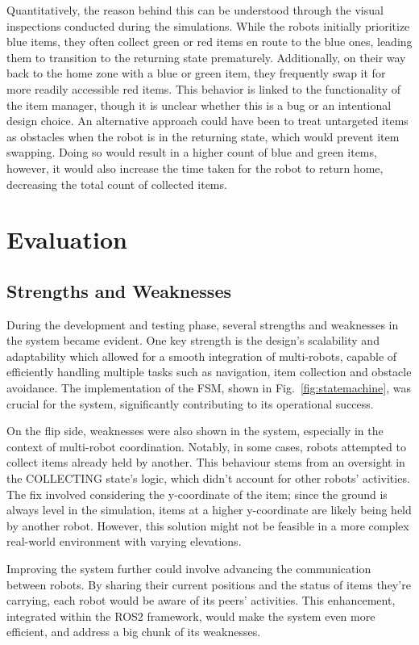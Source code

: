 \documentclass[conference]{IEEEtran}
\begin{document}
Quantitatively, the reason behind this can be understood through the visual inspections conducted during the simulations. While the robots initially prioritize blue items, they often collect green or red items en route to the blue ones, leading them to transition to the returning state prematurely. Additionally, on their way back to the home zone with a blue or green item, they frequently swap it for more readily accessible red items. This behavior is linked to the functionality of the item manager, though it is unclear whether this is a bug or an intentional design choice. An alternative approach could have been to treat untargeted items as obstacles when the robot is in the returning state, which would prevent item swapping. Doing so would result in a higher count of blue and green items, however, it would also increase the time taken for the robot to return home, decreasing the total count of collected items.

\section{Evaluation}
\subsection{Strengths and Weaknesses}

During the development and testing phase, several strengths and weaknesses in the system became evident. One key strength is the design's scalability and adaptability which allowed for a smooth integration of multi-robots, capable of efficiently handling multiple tasks such as navigation, item collection and obstacle avoidance. The implementation of the FSM, shown in Fig.~\ref{fig:statemachine}, was crucial for the system, significantly contributing to its operational success.

On the flip side, weaknesses were also shown in the system, especially in the context of multi-robot coordination. Notably, in some cases, robots attempted to collect items already held by another. This behaviour stems from an oversight in the COLLECTING state's logic, which didn't account for other robots' activities. The fix involved considering the y-coordinate of the item; since the ground is always level in the simulation, items at a higher y-coordinate are likely being held by another robot. However, this solution might not be feasible in a more complex real-world environment with varying elevations.

Improving the system further could involve advancing the communication between robots. By sharing their current positions and the status of items they're carrying, each robot would be aware of its peers' activities. This enhancement, integrated within the ROS2 framework, would make the system even more efficient, and address a big chunk of its weaknesses.
\end{document}
